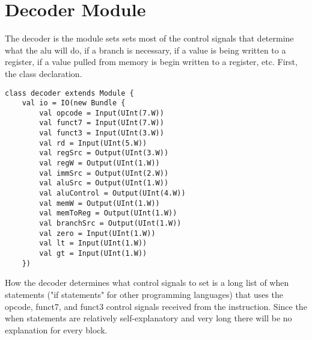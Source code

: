 \documentclass[12pt, letterpaper]{report}
\begin{document}
\section{Decoder Module}
The decoder is the module sets sets most of the control signals that determine what the alu
will do, if a branch is necessary, if a value is being written to a register, if a value pulled from memory is begin written to a register,
etc. First, the class declaration.
\begin{lstlisting}[style=scala]
   class decoder extends Module {
    val io = IO(new Bundle {
        val opcode = Input(UInt(7.W))
        val funct7 = Input(UInt(7.W))
        val funct3 = Input(UInt(3.W))
        val rd = Input(UInt(5.W))
        val regSrc = Output(UInt(3.W))
        val regW = Output(UInt(1.W))
        val immSrc = Output(UInt(2.W))
        val aluSrc = Output(UInt(1.W))
        val aluControl = Output(UInt(4.W))
        val memW = Output(UInt(1.W))
        val memToReg = Output(UInt(1.W))
        val branchSrc = Output(UInt(1.W))
        val zero = Input(UInt(1.W))
        val lt = Input(UInt(1.W))
        val gt = Input(UInt(1.W))
    })
\end{lstlisting}
How the decoder determines what control signals to set is a long list of when statements
("if statements" for other programming languages) that uses the opcode, funct7, and funct3 control signals received from the 
instruction. Since the when statements are relatively self-explanatory and very long there will be no explanation for every block.
\end{document}
